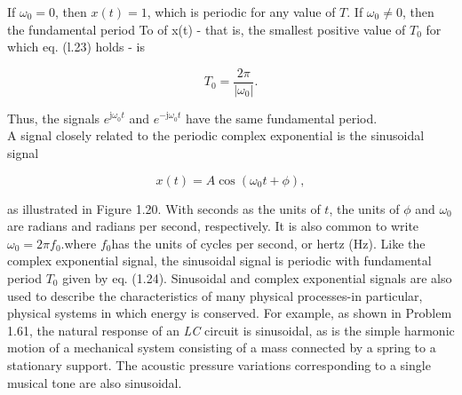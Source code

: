 \documentclass{report}
\begin{document}
If \(\omega _0 = 0\), then \(x(t) = 1\), which is periodic for any value of \(T\). If \(\omega _0\neq 0\), then the fundamental period To of x(t)
- that is, the smallest positive value of \(T_0\) for which eq. (l.23) holds - is

\begin{equation}
T_0=\frac{2\pi }{\left|\omega _0\right|}.
\end{equation}

Thus, the signals \(e^{\text{j$\omega $}_0t}\) and \(e^{-\text{j$\omega $}_0t}\) have the same fundamental period.\\
A signal closely related to the periodic complex exponential is the sinusoidal signal

\begin{equation}
x(t)=A \cos \left(\omega _0t+\phi \right),
\end{equation}

as illustrated in Figure 1.20. With seconds as the units of \(t\), the units of $\phi $ and \(\omega _0\) are radians and radians per second, respectively.
It is also common to write \(\omega _0=2\pi  f_0\).where \(f_0\)has the units of cycles per second, or hertz (Hz). Like the complex exponential signal,
the sinusoidal signal is periodic with fundamental period \(T_0\) given by eq. (1.24). Sinusoidal and complex exponential signals are also used to
describe the characteristics of many physical processes-in particular, physical systems in which energy is conserved. For example, as shown in Problem
1.61, the natural response of an \textit{ LC} circuit is sinusoidal, as is the simple harmonic motion of a mechanical system consisting of a mass
connected by a spring to a stationary support. The acoustic pressure variations corresponding to a single musical tone are also sinusoidal.
\end{document}
